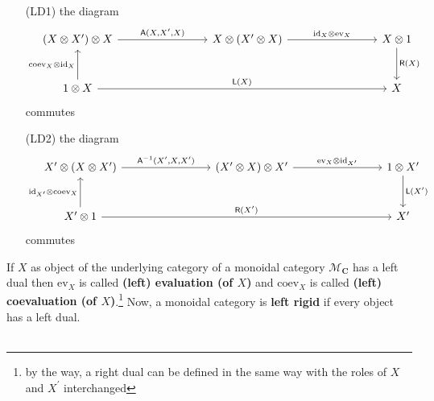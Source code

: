 \begin{enumerate}
\item[(LD1)]
the diagram
\[
\begin{tikzcd}[row sep=large,column sep=8em]
  (X \otimes X^{\prime})
  \otimes
  X
  \arrow{r}{\mathsf{A}(X,X^{\prime},X)}
  &
  X
  \otimes
  (X^{\prime} \otimes X)
  \arrow{r}{\mathrm{id}_{X} \otimes \mathrm{ev}_{X}}
  &
  X
  \otimes
  1
  \arrow{d}{\mathsf{R}(X)}
  \\
  1
  \otimes
  X
  \arrow{u}{\mathrm{coev}_{X} \otimes \mathrm{id}_{X}}
  \arrow{rr}{\mathsf{L}(X)}
  &
  &
  X
\end{tikzcd}
\]
commutes
\item[(LD2)]
the diagram
\[
\begin{tikzcd}[row sep=large,column sep=8em]
  X^{\prime}
  \otimes
  (X \otimes X^{\prime})
  \arrow{r}{\mathsf{A}^{-1}(X^{\prime},X,X^{\prime})}
  &
  (X^{\prime} \otimes X)
  \otimes
  X^{\prime}
  \arrow{r}{\mathrm{ev}_{X} \otimes \mathrm{id}_{X^{\prime}}}
  &
  1
  \otimes
  X^{\prime}
  \arrow{d}{\mathsf{L}(X^{\prime})}
  \\
  X^{\prime}
  \otimes
  1
  \arrow{u}{\mathrm{id}_{X^{\prime}} \otimes \mathrm{coev}_{X}}
  \arrow{rr}{\mathsf{R}(X^{\prime})}
  &
  &
  X^{\prime}
\end{tikzcd}
\]
commutes
\end{enumerate}
If $X$ as object of the underlying category of a monoidal category $\mathcal{M}_{\mathbf{C}}$ has a left dual then $\mathrm{ev}_{X}$ is called \textbf{(left) evaluation (of $X$)} and $\mathrm{coev}_{X}$ is called \textbf{(left) coevaluation (of $X$)}.\footnote{by the way, a right dual can be defined in the same way with the roles of $X$ and $X^{\prime}$ interchanged} Now, a monoidal category is \textbf{left rigid} if every object has a left dual.
\\\\
